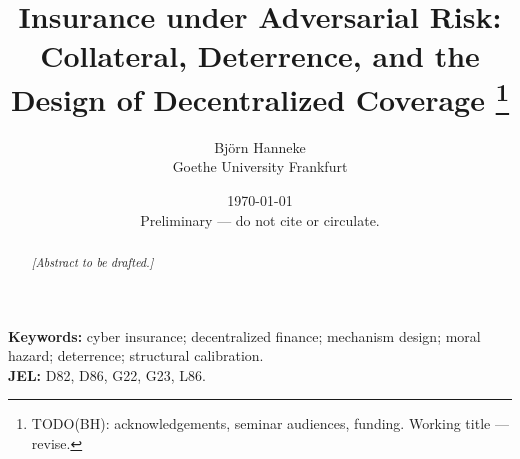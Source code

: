 \documentclass[11pt]{article}
\title{Insurance under Adversarial Risk:\\
Collateral, Deterrence, and the Design of Decentralized Coverage%
\thanks{TODO(BH): acknowledgements, seminar audiences, funding. Working
title --- revise.}}
\author{Bj\"orn Hanneke\\ \small Goethe University Frankfurt}
\date{\today\\ \small Preliminary --- do not cite or circulate.}
\begin{document}
\maketitle

\begin{abstract}
\noindent
\emph{[Abstract to be drafted.]}
\end{abstract}

\bigskip
\noindent\textbf{Keywords:} cyber insurance; decentralized finance;
mechanism design; moral hazard; deterrence; structural calibration.\\
\textbf{JEL:} D82, D86, G22, G23, L86.

\newpage










\appendix

\end{document}
